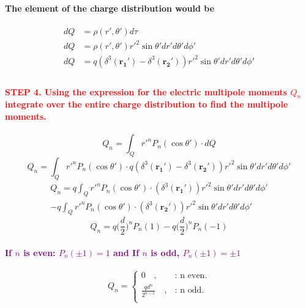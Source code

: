 \documentclass{article}
\begin{document}
\paragraph{\indent The element of the charge distribution would be}
\begin{align*}
    dQ&=\rho(r',\theta')d\tau\\
    dQ&=\rho(r',\theta')r'^2\sin\theta'dr'd\theta'd\phi'\\
    dQ&=q(\delta^3(\boldsymbol{r_1}')-\delta^3(\boldsymbol{r_2}'))r'^2\sin\theta'dr'd\theta'd\phi'\\
\end{align*}
\paragraph{\textcolor{red}{STEP 4. Using the expression for the electric multipole moments $Q_n$ integrate over the entire charge distribution to find the multipole moments.}}
\begin{equation*}
    Q_n=\int_Q r'^n P_n (\cos\theta')\cdot dQ
\end{equation*}
\begin{equation*}
    Q_n=\int_Q r'^n P_n (\cos\theta')\cdot q(\delta^3(\boldsymbol{r_1}')-\delta^3(\boldsymbol{r_2}'))r'^2\sin\theta'dr'd\theta'd\phi'
\end{equation*}
\begin{align*}
    Q_n=q\int_Qr'^n P_n (\cos\theta')\cdot (\delta^3(\boldsymbol{r_1}'))r'^2\sin\theta'dr'd\theta'd\phi'\\
    -q\int_Qr'^n P_n (\cos\theta')\cdot (\delta^3(\boldsymbol{r_2}'))r'^2\sin\theta'dr'd\theta'd\phi'
\end{align*}
\begin{equation*}
    Q_n=q\bigg(\frac{d}{2}\bigg)^n P_n(1)-q\bigg(\frac{d}{2}\bigg)^n P_n(-1)
\end{equation*}
\paragraph{\indent \textcolor{purple}{If $n$ is even: $P_n(\pm 1)=1$ and If $n$ is odd, $P_n(\pm 1)=\pm 1$}}
\begin{equation*}
    Q_n=\begin{cases}
    0\quad, & \text{:   n even}.\\
    \frac{qd^n}{2^{n-1}}\quad, & \text{:   n odd}.\\
    \end{cases}
\end{equation*}
\end{document}
